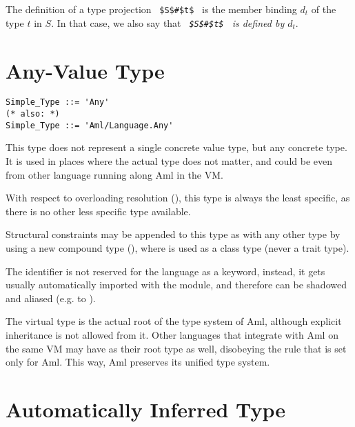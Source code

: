 \begin{enumerate}
The definition of a type projection ~\lstinline!$S$#$t$!~ is the member binding $d_t$ of the type $t$ in $S$. In that case, we also say that {\em ~\lstinline!$S$#$t$!~ is defined by $d_t$}. 

\end{enumerate}







\section{Any-Value Type}
\label{sec:any-value-type}

\syntax\begin{lstlisting}[morekeywords={Any},deletekeywords={also}]
Simple_Type ::= 'Any'
(* also: *)
Simple_Type ::= 'Aml/Language.Any'
\end{lstlisting}

This type does not represent a single concrete value type, but any concrete type. It is used in places where the actual type does not matter, and could be even from other language running along Aml in the VM. 

With respect to overloading resolution (), this type is always the least specific, as there is no other less specific type available. 

Structural constraints may be appended to this type as with any other type by using a new compound type (), where  is used as a class type (never a trait type).

The  identifier is not reserved for the language as a keyword, instead, it gets usually automatically imported with the  module, and therefore can be shadowed and aliased (e.g. to ). 

The  virtual type is the actual root of the type system of Aml, although explicit inheritance is not allowed from it. Other languages that integrate with Aml on the same VM may have  as their root type as well, disobeying the rule that is set only for Aml. This way, Aml preserves its unified type system. 





\section{Automatically Inferred Type}
\label{sec:auto-type}

